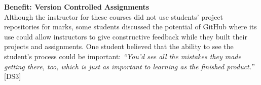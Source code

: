 

\textbf{Benefit: Version Controlled Assignments} \\
%
Although the instructor for these courses did not use students' project repositories for marks, some students discussed the potential of GitHub where its use could allow instructors to give constructive feedback while they built their projects and assignments. One student believed that the ability to see the student's process could be important: \textit{``You'd see all the mistakes they made getting there, too, which is just as important to learning as the finished product.''} [DS3]
\\

